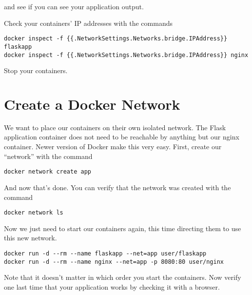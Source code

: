 \documentclass{article}
\begin{document}
and see if you can see your application output. 

Check your containers' IP addresses with the commands

\begin{verbatim}
docker inspect -f {{.NetworkSettings.Networks.bridge.IPAddress}} flaskapp 
docker inspect -f {{.NetworkSettings.Networks.bridge.IPAddress}} nginx
\end{verbatim}

Stop your containers.

\section{Create a Docker Network}
We want to place our containers on their own isolated network. The Flask application container does not need to be reachable by anything but our nginx container. Newer version of Docker make this very easy. First, create our ``network'' with the command

\texttt{docker network create app}

And now that's done. You can verify that the network was created with the command

\texttt{docker network ls}

Now we just need to start our containers again, this time directing them to use this new network.

\begin{verbatim}
docker run -d --rm --name flaskapp --net=app user/flaskapp
docker run -d --rm --name nginx --net=app -p 8080:80 user/nginx
\end{verbatim}

Note that it doesn't matter in which order you start the containers. Now verify one last time that your application works by checking it with a browser.
\end{document}
